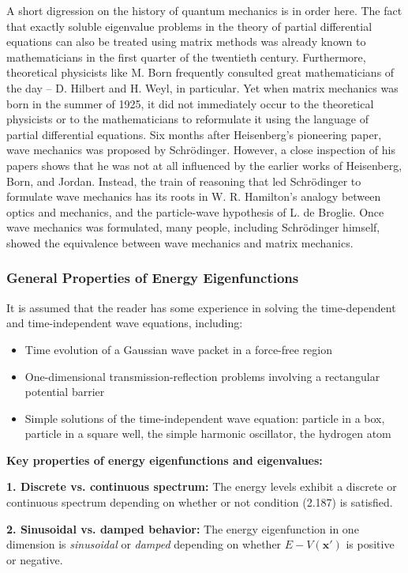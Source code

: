 \documentclass[11pt,a4paper]{article}
\begin{document}
A short digression on the history of quantum mechanics is in order here. The fact that exactly soluble eigenvalue problems in the theory of partial differential equations can also be treated using matrix methods was already known to mathematicians in the first quarter of the twentieth century. Furthermore, theoretical physicists like M. Born frequently consulted great mathematicians of the day -- D. Hilbert and H. Weyl, in particular. Yet when matrix mechanics was born in the summer of 1925, it did not immediately occur to the theoretical physicists or to the mathematicians to reformulate it using the language of partial differential equations. Six months after Heisenberg's pioneering paper, wave mechanics was proposed by Schrödinger. However, a close inspection of his papers shows that he was not at all influenced by the earlier works of Heisenberg, Born, and Jordan. Instead, the train of reasoning that led Schrödinger to formulate wave mechanics has its roots in W. R. Hamilton's analogy between optics and mechanics, and the particle-wave hypothesis of L. de Broglie. Once wave mechanics was formulated, many people, including Schrödinger himself, showed the equivalence between wave mechanics and matrix mechanics.

\subsubsection{General Properties of Energy Eigenfunctions}

It is assumed that the reader has some experience in solving the time-dependent and time-independent wave equations, including:
\begin{itemize}[leftmargin=*]
\item Time evolution of a Gaussian wave packet in a force-free region
\item One-dimensional transmission-reflection problems involving a rectangular potential barrier
\item Simple solutions of the time-independent wave equation: particle in a box, particle in a square well, the simple harmonic oscillator, the hydrogen atom
\end{itemize}

\textbf{Key properties of energy eigenfunctions and eigenvalues:}

\textbf{1. Discrete vs. continuous spectrum:} The energy levels exhibit a discrete or continuous spectrum depending on whether or not condition (2.187) is satisfied.

\textbf{2. Sinusoidal vs. damped behavior:} The energy eigenfunction in one dimension is \textit{sinusoidal} or \textit{damped} depending on whether $E - V(\mathbf{x}')$ is positive or negative.
\end{document}
